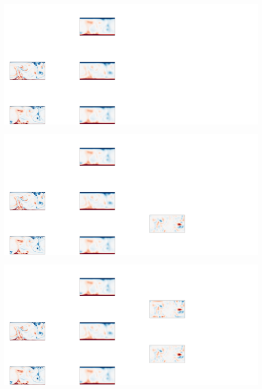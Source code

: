\documentclass[12pt, aspectratio=169]{beamer}
\begin{document}
\begin{frame}
    \centering
    \includegraphics[width=\linewidth]{figures/method4.pdf}
\end{frame}

\begin{frame}
    \centering
    \includegraphics[width=\linewidth]{figures/method5.pdf}
\end{frame}

\begin{frame}
    \centering
    \includegraphics[width=\linewidth]{figures/method6.pdf}
\end{frame}
\end{document}
